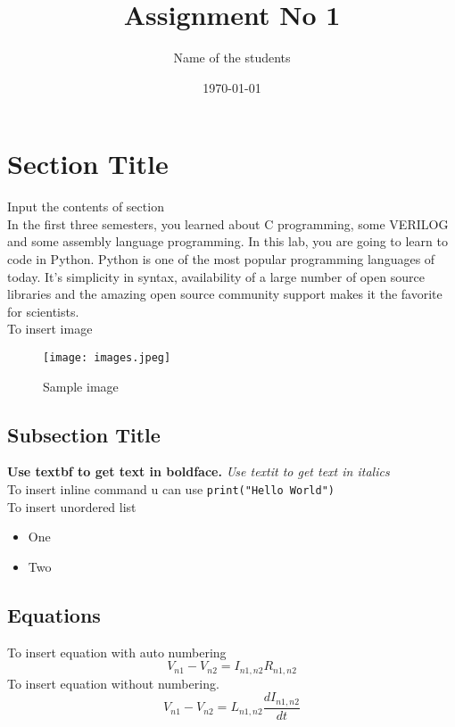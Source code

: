 \documentclass[11pt, a4paper]{article}
\title{Assignment No 1} %
\author{Name of the students} %
\date{\today} %
\begin{document}
		
		
\maketitle %
\section{Section Title}

 Input the contents of section \\
 In the first three semesters, you learned about C programming, some VERILOG and some assembly language programming. In this lab, you are going to learn to code in Python. Python is one of the most popular programming languages of today. It’s simplicity in syntax, availability of a large number of open source libraries and the amazing open source community support makes it the favorite for scientists. \\
To insert image 
   \begin{figure}[!tbh]
   	\centering
   	\texttt{[image: images.jpeg]}  %
   	\caption{Sample image}
   	\label{fig:sample}
   \end{figure} 
\subsection*{Subsection Title}
	
  \textbf{Use textbf to get text in boldface.}
  \textit{Use textit to get text in italics} \\
  To insert inline command u can use \texttt{print("Hello World")} \\
  To insert unordered list
  \begin{itemize}
  	\item One
  	\item Two
  \end{itemize} 
 \subsection{Equations}
 To insert equation with auto numbering
  \begin{equation}\label{eq:1}
  V_{n1}-V_{n2}=I_{n1,n2} R_{n1,n2}
  \end{equation}
  To insert equation without numbering.
\begin{equation*}
 V_{n1}-V_{n2}=L_{n1,n2} \frac{dI_{n1,n2}}{dt}
\end{equation*}
\end{document}
